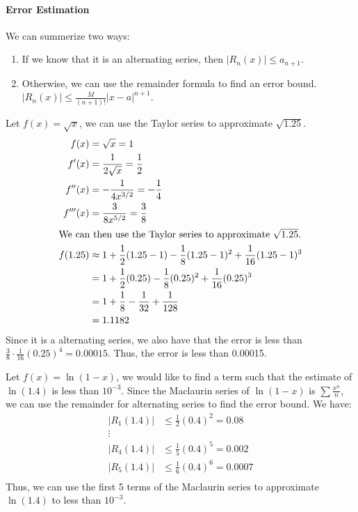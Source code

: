 \documentclass[11pt]{report}
\begin{document}
\paragraph{Error Estimation} We can summerize two ways:
\begin{enumerate}
    \item If we know that it is an alternating series, then $|R_n(x)| \le a_{n+1}$.
    \item Otherwise, we can use the remainder formula to find an error bound. $|R_n(x)| \le \frac{M}{(n+1)!} |x-a|^{n+1}$.
\end{enumerate}
\begin{example}
    Let $f(x) = \sqrt{x}$, we can use the Taylor series to approximate $\sqrt{1.25}$.
    \begin{align*}
        f(x) &= \sqrt{x} = 1\\
        f'(x) &= \frac{1}{2\sqrt{x}} = \frac{1}{2} \\
        f''(x) &= -\frac{1}{4x^{3/2}} = -\frac{1}{4} \\
        f'''(x) &= \frac{3}{8x^{5/2}} = \frac{3}{8} \\
        \intertext{We can then use the Taylor series to approximate $\sqrt{1.25}$.}
        f(1.25) &\approx 1 + \frac{1}{2}(1.25-1) - \frac{1}{8}(1.25-1)^2 + \frac{1}{16}(1.25-1)^3 \\
        &= 1 + \frac{1}{2}(0.25) - \frac{1}{8}(0.25)^2 + \frac{1}{16}(0.25)^3 \\
        &= 1 + \frac{1}{8} - \frac{1}{32} + \frac{1}{128} \\
        &= 1.1182
    \end{align*}
    Since it is a alternating series, we also have that the error is less than $\frac{3}{8} \cdot \frac{1}{16} (0.25)^4 = 0.00015$. Thus, the error is less than 0.00015.
\end{example}
\begin{example}
    Let $f(x) = \ln(1-x)$, we would like to find a term such that the estimate of $\ln(1.4)$ is less than $10^{-3}$. Since the Maclaurin series of $\ln(1-x)$ is $\sum \frac{x^n}{n}$, we can use the remainder for alternating series to find the error bound. We have:
    \begin{align*}
        |R_1(1.4)| &\le \frac{1}{2} (0.4)^2 = 0.08 \\
        \vdots \\
        |R_4(1.4)| &\le \frac{1}{5} (0.4)^5 = 0.002\\
        |R_5(1.4)| &\le \frac{1}{6} (0.4)^6 = 0.0007 \\
    \end{align*}
    Thus, we can use the first 5 terms of the Maclaurin series to approximate $\ln(1.4)$ to less than $10^{-3}$.
\end{example}
\end{document}
